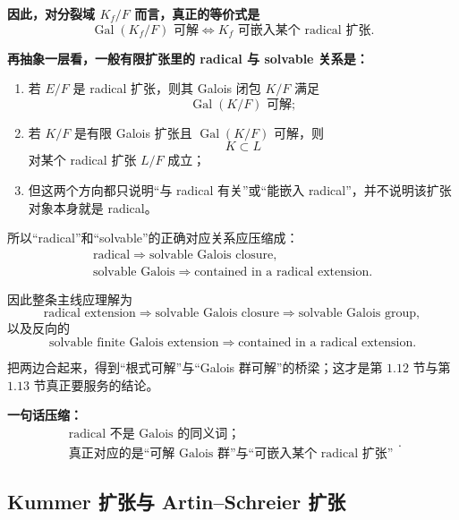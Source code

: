 \documentclass[a4paper]{ctexart}
\theoremstyle{definition}
\theoremstyle{analysis}
\theoremstyle{plain}
\begin{document}
\medskip

\textbf{因此，对分裂域 \(K_f/F\) 而言，真正的等价式是}
\[
  \operatorname{Gal}(K_f/F)\text{ 可解}
  \iff
  K_f \text{ 可嵌入某个 radical 扩张}.
\]

\medskip

\textbf{再抽象一层看，一般有限扩张里的 radical 与 solvable 关系是：}
\begin{enumerate}
  \item 若 \(E/F\) 是 radical 扩张，则其 Galois 闭包 \(K/F\) 满足
  \[
    \operatorname{Gal}(K/F)\text{ 可解};
  \]
  \item 若 \(K/F\) 是有限 Galois 扩张且 \(\operatorname{Gal}(K/F)\) 可解，则
  \[
    K \subset L
  \]
  对某个 radical 扩张 \(L/F\) 成立；
  \item 但这两个方向都只说明“与 radical 有关”或“能嵌入 radical”，并不说明该扩张对象本身就是 radical。
\end{enumerate}

所以“radical”和“solvable”的正确对应关系应压缩成：
\[
  \begin{array}{c}
    \text{radical}
    \Longrightarrow
    \text{solvable Galois closure},\\[2pt]
    \text{solvable Galois}
    \Longrightarrow
    \text{contained in a radical extension}.
  \end{array}
\]

因此整条主线应理解为
\[
  \text{radical extension}
  \Longrightarrow
  \text{solvable Galois closure}
  \Longrightarrow
  \text{solvable Galois group},
\]
以及反向的
\[
  \text{solvable finite Galois extension}
  \Longrightarrow
  \text{contained in a radical extension}.
\]

把两边合起来，得到“根式可解”与“Galois 群可解”的桥梁；这才是第 \(1.12\) 节与第 \(1.13\) 节真正要服务的结论。

\medskip

\textbf{一句话压缩：}
\[
  \boxed{
  \begin{array}{c}
    \text{radical 不是 Galois 的同义词；}\\
    \text{真正对应的是“可解 Galois 群”与“可嵌入某个 radical 扩张”}
  \end{array}
  }.
\]

\subsection{\texorpdfstring{Kummer 扩张与 Artin--Schreier 扩张}{Kummer 扩张与 Artin--Schreier 扩张}}\label{subsec:topic-kummer-artin-schreier}
\end{document}
